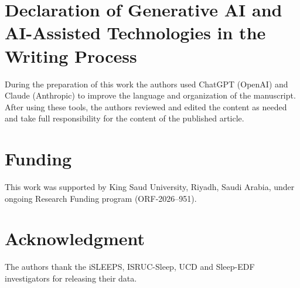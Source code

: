 \documentclass[a4paper,fleqn]{cas-sc}
\begin{document}
\section*{Declaration of Generative AI and AI-Assisted Technologies in the Writing Process}
During the preparation of this work the authors used ChatGPT (OpenAI) and Claude (Anthropic) to
improve the language and organization of the manuscript. After using these tools, the authors
reviewed and edited the content as needed and take full responsibility for the content of the
published article.

\section*{Funding}
This work was supported by King Saud University, Riyadh, Saudi Arabia, under ongoing Research Funding program (ORF-2026–951).

\section*{Acknowledgment}
The authors thank the iSLEEPS, ISRUC-Sleep, UCD and Sleep-EDF investigators for releasing
their data.



\end{document}
